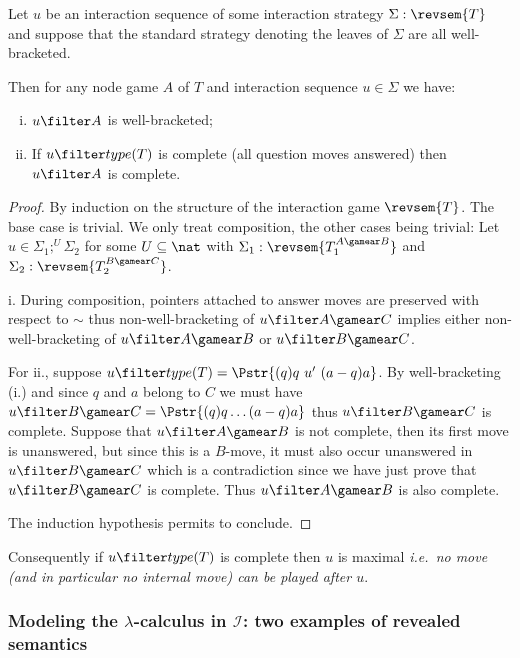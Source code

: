 \begin{lemma}
\label{lem:inter_complete}
Let $u$ be an interaction sequence of some interaction strategy $\Sigma : \revsem{T}$
and suppose that the standard strategy denoting the leaves of $\Sigma$ are all well-bracketed.

Then for any node game $A$ of $T$ and interaction sequence $u\in
\Sigma$ we have:
\begin{enumerate}[i.]
\item $u \filter A$ is well-bracketed;

\item If $u \filter type(T)$ is complete (all question moves answered) then
    $u \filter A$ is complete.
\end{enumerate}
\end{lemma}
\begin{proof}
By induction on the structure of the interaction game
$\revsem{T}$. The base case is trivial. We only treat composition,
the other cases being trivial: Let $ u \in \Sigma_1 ; ^U \Sigma_2$
for some $U \subseteq \nat$ with $\Sigma_1 : \revsem{T_1^{A\gamear
B}}$ and $\Sigma_2 : \revsem{T_2^{B\gamear C}}$.

i. During composition, pointers attached to answer moves are
preserved with respect to $\sim$ thus non-well-bracketing of
$u\filter A\gamear C$ implies either non-well-bracketing of
$u\filter A\gamear B$ or $u\filter B\gamear C$.

For ii., suppose $u \filter type(T) = \Pstr{(q)q\ u'\ (a-q)a }$. By
well-bracketing (i.) and since $q$ and $a$ belong to $C$ we must
have $u \filter B\gamear C = \Pstr{(q)q \ldots (a-q)a}$ thus $u
\filter B\gamear C$ is complete. Suppose that $u \filter A\gamear B$
is not complete, then its first move is unanswered, but since this
is a $B$-move, it must also occur unanswered in $u \filter B\gamear
C$ which is a contradiction since we have just prove that $u \filter
B\gamear C$ is complete. Thus $u \filter A\gamear B$ is also
complete.

The induction hypothesis permits to conclude.
\end{proof}
Consequently if $u\filter type(T)$ is complete then $u$ is maximal {\em i.e.~no move (and in particular no internal move) can be played after $u$}.

\subsubsection{Modeling the $\lambda$-calculus in $\mathcal{I}$: two examples of revealed semantics}

